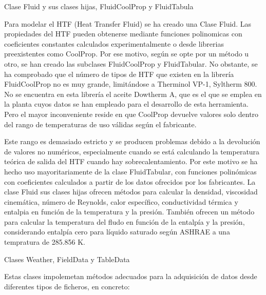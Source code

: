 \documentclass[12pt]{report} %
\begin{document}
\hypertarget{clase-fluid-y-sus-clases-hijas-fluidcoolprop-y-fluidtabular}{Clase Fluid y sus clases hijas, FluidCoolProp y FluidTabula}

Para modelar el HTF (Heat Transfer Fluid) se ha creado una Clase Fluid.
Las propiedades del HTF pueden obtenerse mediante funciones polinomicas con coeficientes constantes calculados experimentalmente o desde librerias preexistentes como CoolProp. Por ese motivo, según se opte por un método u otro, se han creado las subclases FluidCoolProp y FluidTabular. No obstante, se ha comprobado que el número de tipos de HTF que existen en la librería FluidCoolProp no es muy grande, limitándose a Therminol VP-1, Syltherm 800. No se encuentra en esta
librería el aceite Dowtherm A, que es el que se emplea en la planta cuyos datos se han empleado para el desarrollo de esta herramienta. Pero el mayor inconveniente reside en que CoolProp devuelve valores solo dentro del rango de temperaturas de uso válidas según el fabricante. 

Este rango es demasiado estricto y se producen problemas debido a la devolución de valores no numéricos, especialmente cuando se está calculando la temperatura teórica de salida del HTF cuando hay sobrecalentamiento. Por este motivo se ha hecho uso mayoritariamente de la clase FluidTabular, con funciones polinómicas con coeficientes calculados a partir de los datos ofrecidos por los fabricantes.  La clase Fluid sus clases hijas ofrecen métodos para calcular la densidad, viscosidad cinemática, número de Reynolds, calor específico, conductividad térmica y entalpia en función de la temperatura y la presión. También ofrecen un método para calcular la temperatura del fludo en función de la entalpía y la presión, considerando entalpía cero para líquido saturado según ASHRAE a una tempratura de 285.856 K.

\hypertarget{clases-weather-fielddata-y-tabledata}{Clases Weather, FieldData y TableData}
Estas clases impolemetan métodos adecuados para la adquisición de datos desde diferentes tipos de ficheros, en concreto:
\end{document}
